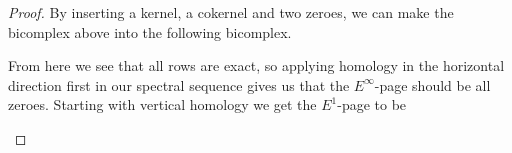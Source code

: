 \begin{proof}
By inserting a kernel, a cokernel and two zeroes, we can make the bicomplex above into the following bicomplex. 
\begin{center}
\end{center}
From here we see that all rows are exact, so applying homology in the horizontal direction first in our spectral sequence gives us that the $E^{\infty}$-page should be all zeroes. Starting with vertical homology we get the $E^1$-page to be
\begin{center}
\end{center}
\end{proof}
